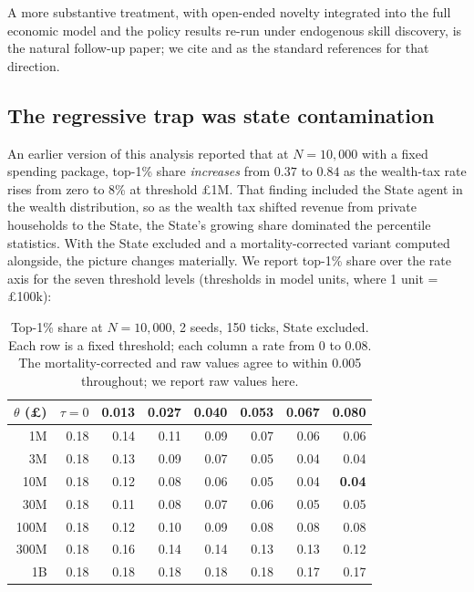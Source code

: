 \documentclass[11pt]{article}
\begin{document}
A more substantive treatment, with open-ended novelty integrated
into the full economic model and the policy results re-run under
endogenous skill discovery, is the natural follow-up paper; we cite
\citet{taylor2019evolutionary} and \citet{banzhaf2016defining} as
the standard references for that direction.

\subsection{The regressive trap was state contamination}
\label{sec:regressive-trap}

An earlier version of this analysis reported that at $N=10{,}000$
with a fixed spending package, top-1\% share \emph{increases} from
$0.37$ to $0.84$ as the wealth-tax rate rises from zero to 8\% at
threshold \pounds 1M. That finding included the State agent in the
wealth distribution, so as the wealth tax shifted revenue from
private households to the State, the State's growing share dominated
the percentile statistics. With the State excluded and a
mortality-corrected variant computed alongside, the picture changes
materially. We report top-1\% share over the rate axis for the seven
threshold levels (thresholds in model units, where 1 unit =
\pounds 100k):

\begin{table}[t]
\centering
\small
\caption{Top-1\% share at $N=10{,}000$, 2 seeds, 150 ticks, State
excluded. Each row is a fixed threshold; each column a rate from 0
to 0.08. The mortality-corrected and raw values agree to within
0.005 throughout; we report raw values here.}
\label{tab:taxsweep10k}
\begin{tabular}{rrrrrrrr}
\toprule
$\theta$ (\pounds) & $\tau=0$ & 0.013 & 0.027 & 0.040 & 0.053 & 0.067 & 0.080 \\
\midrule
1M    & 0.18 & 0.14 & 0.11 & 0.09 & 0.07 & 0.06 & 0.06 \\
3M    & 0.18 & 0.13 & 0.09 & 0.07 & 0.05 & 0.04 & 0.04 \\
10M   & 0.18 & 0.12 & 0.08 & 0.06 & 0.05 & 0.04 & \textbf{0.04} \\
30M   & 0.18 & 0.11 & 0.08 & 0.07 & 0.06 & 0.05 & 0.05 \\
100M  & 0.18 & 0.12 & 0.10 & 0.09 & 0.08 & 0.08 & 0.08 \\
300M  & 0.18 & 0.16 & 0.14 & 0.14 & 0.13 & 0.13 & 0.12 \\
1B    & 0.18 & 0.18 & 0.18 & 0.18 & 0.18 & 0.17 & 0.17 \\
\bottomrule
\end{tabular}
\end{table}
\end{document}
